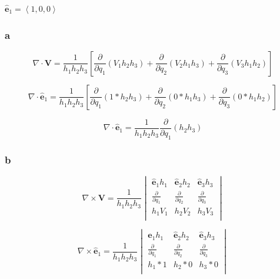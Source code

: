 \documentclass[12pt]{article}
\begin{document}
\(\hat{\textbf{e}}_1 = \left\langle1, 0, 0\right\rangle \)

\subsubsection{a}

\[
    \nabla \cdot \textbf{V} = \frac{1}{h_1 h_2 h_3}
    \left[
        \frac{\partial}{\partial q_1}\left(V_1 h_2 h_3\right)
        + \frac{\partial}{\partial q_2}\left(V_2 h_1 h_3\right)
        + \frac{\partial}{\partial q_3}\left(V_3 h_1 h_2\right)
        \right]
\]

\[
    \nabla \cdot \hat{\textbf{e}}_1 = \frac{1}{h_1 h_2 h_3}
    \left[
        \frac{\partial}{\partial q_1}\left(1 * h_2 h_3\right)
        + \frac{\partial}{\partial q_2}\left(0 * h_1 h_3\right)
        + \frac{\partial}{\partial q_3}\left(0 * h_1 h_2\right)
        \right]
\]

\[
    \nabla \cdot \hat{\textbf{e}}_1 = \frac{1}{h_1 h_2 h_3} \frac{\partial}{\partial q_1}\left(h_2 h_3\right)
\]

\subsubsection{b}

\[
    \nabla \times \textbf{V} = \frac{1}{h_1 h_2 h_3}
    \begin{vmatrix}
        \hat{\textbf{e}}_1 h_1        & \hat{\textbf{e}}_2 h_2        & \hat{\textbf{e}}_3 h_3        \\
        \frac{\partial}{\partial q_1} & \frac{\partial}{\partial q_2} & \frac{\partial}{\partial q_3} \\
        h_1 V_1                       & h_2 V_2                       & h_3 V_3                       \\
    \end{vmatrix}
\]

\[
    \nabla \times \hat{\textbf{e}}_1 = \frac{1}{h_1 h_2 h_3}
    \begin{vmatrix}
        \hat{\textbf{e}}_1 h_1        & \hat{\textbf{e}}_2 h_2        & \hat{\textbf{e}}_3 h_3        \\
        \frac{\partial}{\partial q_1} & \frac{\partial}{\partial q_2} & \frac{\partial}{\partial q_3} \\
        h_1*1                         & h_2*0                         & h_3*0                         \\
    \end{vmatrix}
\]
\end{document}

